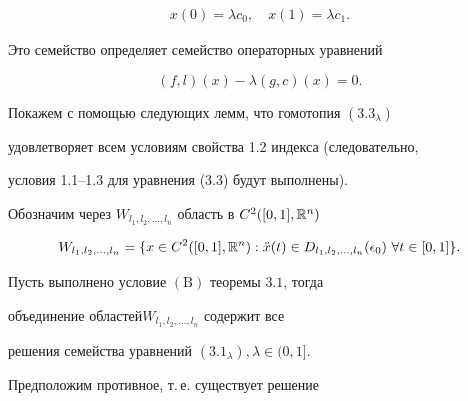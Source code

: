 \begin{pf}
\begin{gather}
%


x(0)=\lambda c_0,\quad


x(1) = \lambda c_1. 


\tag{3.2$_\lambda$}


\end{gather}


Это семейство определяет семейство операторных уравнений


\begin{equation}


(f, l)(x) - \lambda (g, c)(x) = 0.


\tag{3.3$_\lambda$}


\end{equation}





Покажем с помощью следующих лемм, что гомотопия $(3.3_\lambda)$


удовлетворяет всем условиям свойства 1.2 индекса (следовательно,


условия 1.1--1.3 для уравнения (3.3) будут выполнены).





Обозначим через $W_{l_1, l_2, \dotsc, l_n}$ область в $C^2([0,1],


{\Bbb R}^n)$


$$


W_{l_1, l_2, \dotsc, l_n} = \{x\in C^2([0,1], {\Bbb R}^n):


\Ddot x(t) \in D_{l_1, l_2, \dotsc, l_n}(\epsilon_0) \


\forall t\in [0,1]\}.


$$





\begin{lems}


Пусть выполнено условие $\mathrm{(B)}$ теоремы $3.1$, тогда


объединение областей\linebreak $W_{l_1, l_2, \dotsc, l_n}$ содержит все


решения семейства уравнений $(3.1_\lambda), \lambda\in (0,1]$.


\end{lems}





\begin{pf}


Предположим противное, т.\,е. существует решение



\end{pf}
\end{pf}
